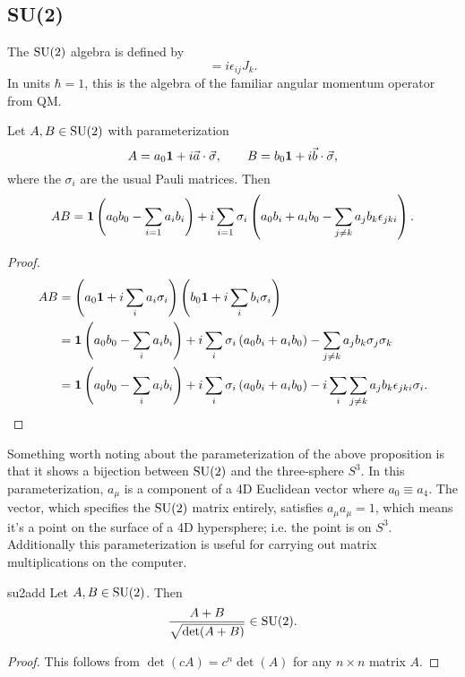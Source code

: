 \subsection{SU(2)}

The $\operatorname{SU}(2)$ algebra is defined by
\begin{equation}
  [J_i,J_j]=i\epsilon_{ij}J_k.
\end{equation}
In units $\hbar=1$, this is the algebra of the familiar angular momentum
operator from QM. 

\begin{proposition}{}{}
  Let $A,B\in\operatorname{SU}(2)$ with parameterization
  $$
    A=a_0{\mathbf 1}+i\vec{a}\cdot\vec{\sigma}, \qquad
    B=b_0{\mathbf 1}+i\vec{b}\cdot\vec{\sigma},
  $$
  where the $\sigma_i$ are the usual Pauli matrices. Then
  \begin{equation*}
    AB={\mathbf 1}\left(a_0b_0-\sum\limits_{i=1}a_ib_i\right)
        +i\sum\limits_{i=1}\sigma_i\left(a_0b_i+a_ib_0
          -\sum\limits_{j\neq k}a_jb_k\epsilon_{jki}\right).
  \end{equation*}
  \begin{proof}
    \begin{equation*}
      \begin{aligned}
        AB&=\left(a_0{\mathbf 1}+i\sum\limits_ia_i\sigma_i\right)
            \left(b_0{\mathbf 1}+i\sum\limits_ib_i\sigma_i\right)\\
          &={\mathbf 1}\left(a_0b_0-\sum\limits_ia_ib_i\right)
            +i\sum\limits_i\sigma_i\left(a_0b_i+a_ib_0\right)
            -\sum\limits_{j\neq k}a_jb_k\sigma_j\sigma_k \\
          &={\mathbf 1}\left(a_0b_0-\sum\limits_ia_ib_i\right)
            +i\sum\limits_i\sigma_i\left(a_0b_i+a_ib_0\right)
            -i\sum\limits_i
                \sum\limits_{j\neq k}a_jb_k\epsilon_{jki}\sigma_i.
      \end{aligned}
    \end{equation*}
  \end{proof}
\end{proposition}
Something worth noting about the parameterization of the above proposition
is that it shows a bijection between $\operatorname{SU}(2)$ and the three-sphere $S^3$.
In this parameterization, $a_\mu$ is a component of a 4D Euclidean vector where
$a_0\equiv a_4$. The vector, which specifies the $\operatorname{SU}(2)$ matrix entirely,
satisfies $a_\mu a_\mu=1$, which means it's a point on the surface of a 4D
hypersphere; i.e. the point is on $S^3$.
Additionally this parameterization is useful for carrying out
matrix multiplications on the computer.

\begin{proposition}{}{su2add}
  Let $A,B\in\operatorname{SU}(2)$. Then
  $$
  \frac{A+B}{\sqrt{\det(A+B)}}\in\operatorname{SU}(2).
  $$
  \begin{proof}
    This follows from $\det(cA)=c^n\det(A)$ for any $n\times n$ matrix $A$.
  \end{proof}
\end{proposition}



 
